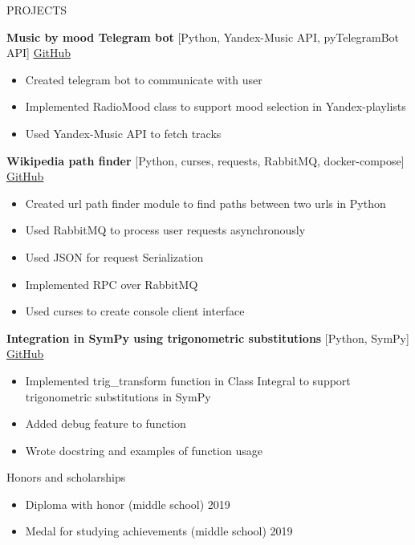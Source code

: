 \documentclass{resume} %
\begin{document}
\begin{rSection}{PROJECTS}
\vspace{-1.25em}
\item \textbf{Music by mood Telegram bot} {[Python, Yandex-Music API, pyTelegramBot API]} \hfill \href{https://github.com/rubin-do/MoodTelegramBot}{GitHub}
\begin{itemize}
    \itemsep -3pt {} 
     \item Created telegram bot to communicate with user
    \item Implemented RadioMood class to support mood selection in Yandex-playlists
     \item Used Yandex-Music API to fetch tracks
 \end{itemize}
\item \textbf{Wikipedia path finder} {[Python, curses, requests, RabbitMQ, docker-compose]} \hfill \href{https://github.com/rubin-do/wiki-path-finder}{GitHub}
\begin{itemize}
    \itemsep -3pt {} 
     \item Created url path finder module to find paths between two urls in Python
     \item Used RabbitMQ to process user requests asynchronously
     \item Used JSON for request Serialization
    \item Implemented RPC over RabbitMQ
    \item Used curses to create console client interface
 \end{itemize}
\item \textbf{Integration in SymPy using trigonometric substitutions} {[Python, SymPy]} \hfill \href{https://github.com/rubin-do/sympy-project}{GitHub}
\begin{itemize}
    \itemsep -3pt {} 
     \item Implemented trig\_transform function in Class Integral to support trigonometric substitutions in SymPy
     \item Added debug feature to function
    \item Wrote docstring and examples of function usage
 \end{itemize}
\end{rSection} 

\begin{rSection}{Honors and scholarships} 
\begin{itemize}
    \item 	Diploma with honor (middle school) \hfill  2019
    \item	Medal for studying achievements (middle school) \hfill 2019
\end{itemize}


\end{rSection}
\end{document}

